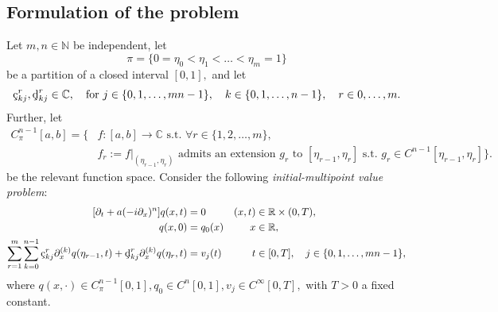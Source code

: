 \documentclass[10pt,reqno,oneside,a4paper]{article}
\begin{document}
\subsection{Formulation of the problem}
Let $m, n \in \mathbb{N}$ be independent, let 
\[ 
\pi = \{ 0 = \eta_0 < \eta_1 < \ldots < \eta_m = 1 \}
\]
be a partition of a closed interval $[0,1],$ and 
let 
\begin{align*}
\textup{\c{c}}_{k j}^r, \textup{\c{d}}_{kj}^r \in \CC,  \quad \mbox{for } j \in \{ 0, 1, \ldots, mn-1\}, \quad k \in \{ 0, 1, \ldots, n-1\}, \quad r \in {0, \ldots, m}.
\end{align*} 
Further, let 
\begin{equation*}
\begin{aligned}
C^{n-1}_{\pi}[a,b] = \Big\{ &f: [a,b] \to \mathbb{C} \mbox{ s.t. } \forall r \in \{1, 2, \ldots,m \}, \\
&f_r := f\big\vert_{(\eta_{r-1}, \eta_r)} \mbox{ admits an extension } g_r \mbox{ to } [\eta_{r-1}, \eta_r] \mbox{ s.t. } g_r \in C^{n-1}[\eta_{r-1}, \eta_r] \Big\}.
\end{aligned}
\end{equation*}
be the relevant function space.
Consider the following \emph{initial-multipoint value problem}:
\begin{subequations} \label{eqn:uProblem}
\begin{align}
    \label{eqn:uProblem.PDE}
    [\partial_t + a(-i\partial_x)^n]q(x,t) &= 0 & (x,t) &\in \RR\times(0,T), \\
    \label{eqn:uProblem.InC}
    q(x,0) &= q_0(x) & x &\in\RR, \\
    \label{eqn:uProblem.MC}
    \sum^{m}_{r=1} \sum^{n-1}_{k=0} \textup{\c{c}}_{k j}^r  \partial_x^{(k)} q(\eta_{r-1}, t) + \textup{\c{d}}_{kj}^r  \partial_x^{(k)} q(\eta_{r}, t) &= v_j(t) & t &\in [0,T], \quad j \in \{ 0, 1, \ldots, mn-1\},
\end{align}
\end{subequations}
where $q(x, \cdot) \in C^{n-1}_{\pi}[0,1], q_0\in C^n[0,1], v_j \in C^{\infty}[0,T],$ with $T>0$ a fixed constant.
\end{document}

